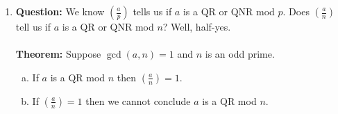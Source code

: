 \documentclass[class=article, crop=false]{standalone}
\begin{document}
\begin{enumerate}
	\item \textbf{Question:} We know $\left(\frac{a}{p}\right)$ tells us if $a$ is a QR or QNR mod $p$.
	Does $\left(\frac{a}{n}\right)$ tell us if $a$ is a QR or QNR mod $n$?
	Well, half-yes.\\\\
	\textbf{Theorem:} Suppose $\gcd(a,n)=1$ and $n$ is an odd prime.
	\begin{enumerate}[(a)]
		\item If $a$ is a QR mod $n$ then $\left(\frac{a}{n}\right)=1$.
		\item If $\left(\frac{a}{n}\right)=1$ then we cannot conclude $a$ is a QR mod $n$.
	\end{enumerate}
\end{enumerate}

\end{document}

